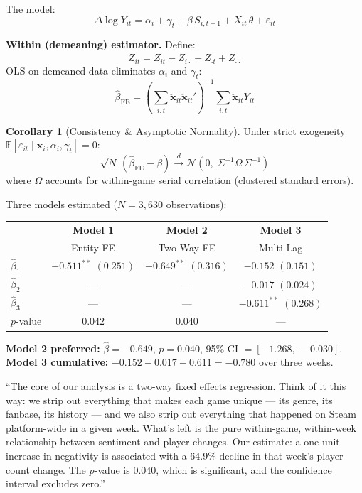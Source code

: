 \documentclass[11pt, letterpaper]{article}
\theoremstyle{definition}
\newtheorem{corollary}[theorem]{Corollary}
\begin{document}
\begin{mathbox}
The model:
\[
    \Delta\log Y_{it} = \alpha_i + \gamma_t + \beta\, S_{i,t-1} + X_{it}\,\theta + \varepsilon_{it}
\]

\textbf{Within (demeaning) estimator.} Define:
\[
    \ddot{Z}_{it} = Z_{it} - \bar{Z}_{i\cdot} - \bar{Z}_{\cdot t} + \bar{Z}_{\cdot\cdot}
\]
OLS on demeaned data eliminates $\alpha_i$ and $\gamma_t$:
\[
    \hat{\beta}_{\text{FE}} = \left(\sum_{i,t} \ddot{\mathbf{x}}_{it}\ddot{\mathbf{x}}_{it}'\right)^{-1} \sum_{i,t} \ddot{\mathbf{x}}_{it}\ddot{Y}_{it}
\]

\begin{corollary}[Consistency \& Asymptotic Normality]
Under strict exogeneity $\mathbb{E}[\varepsilon_{it} \mid \mathbf{x}_i, \alpha_i, \gamma_t] = 0$:
\[
    \sqrt{N}\,(\hat{\beta}_{\text{FE}} - \beta) \xrightarrow{d} \mathcal{N}\!\left(0,\; \Sigma^{-1}\Omega\,\Sigma^{-1}\right)
\]
where $\Omega$ accounts for within-game serial correlation (clustered standard errors).
\end{corollary}
\end{mathbox}

\begin{resultbox}
Three models estimated ($N = 3{,}630$ observations):
\begin{center}
\small
\begin{tabular}{lccc}
\toprule
& \textbf{Model 1} & \textbf{Model 2} & \textbf{Model 3} \\
& Entity FE & Two-Way FE & Multi-Lag \\
\midrule
$\hat{\beta}_1$ & $-0.511^{**}$ $(0.251)$ & $-0.649^{**}$ $(0.316)$ & $-0.152$ $(0.151)$ \\
$\hat{\beta}_2$ & --- & --- & $-0.017$ $(0.024)$ \\
$\hat{\beta}_3$ & --- & --- & $-0.611^{**}$ $(0.268)$ \\
$p$-value & $0.042$ & $0.040$ & --- \\
\bottomrule
\end{tabular}
\end{center}

\textbf{Model 2 preferred:} $\hat{\beta} = -0.649$, $p = 0.040$, 95\% CI $= [-1.268,\,-0.030]$.\\
\textbf{Model 3 cumulative:} $-0.152 - 0.017 - 0.611 = -0.780$ over three weeks.
\end{resultbox}

\begin{speakerbox}
``The core of our analysis is a two-way fixed effects regression.
Think of it this way: we strip out everything that makes each game unique --- its genre, its fanbase, its history --- and we also strip out everything that happened on Steam platform-wide in a given week.
What's left is the pure within-game, within-week relationship between sentiment and player changes.
Our estimate: a one-unit increase in negativity is associated with a 64.9\% decline in that week's player count change.
The $p$-value is 0.040, which is significant, and the confidence interval excludes zero.''
\end{speakerbox}
\end{document}
